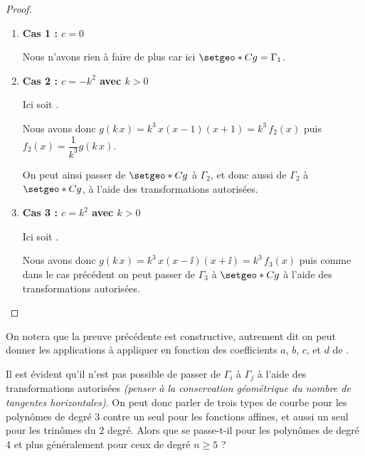 \begin{proof}
\begin{enumerate}


		\item \textbf{Cas 1 : $c = 0$}

		      \smallskip

		      \noindent
		      Nous n'avons rien à faire de plus car ici $\setgeo*{C}{g} = \Gamma_1$.




		\item \textbf{Cas 2 : $c = - k^2$ avec $k > 0$}

		      \smallskip

		      \noindent
		      Ici
		      soit
		      .

		      \smallskip

		      \noindent
		      Nous avons donc $g(k \, x) = k^3 \, x(x - 1)(x + 1) = k^3 \, f_2(x)$
		      puis
		      $f_2(x) = \dfrac{1}{k^3} g(k \, x)$.

		      \smallskip

		      \noindent
		      On peut ainsi passer de $\setgeo*{C}{g}$ à $\Gamma_2$, et donc aussi de $\Gamma_2$ à $\setgeo*{C}{g}$, à l'aide des transformations autorisées.




		\item \textbf{Cas 3 : $c = k^2$ avec $k > 0$}

		      \smallskip

		      \noindent
		      Ici
		      soit
		      .

		      \smallskip

		      \noindent
		      Nous avons donc $g(k \, x) = k^3 \, x(x - \ii)(x + \ii) = k^3 \, f_3(x)$
		      puis comme dans le cas précédent on peut passer de $\Gamma_3$ à $\setgeo*{C}{g}$ à l'aide des transformations autorisées.
	\end{enumerate}
\end{proof}




On notera que la preuve précédente est constructive, autrement dit on peut donner les applications à appliquer en fonction des coefficients $a$, $b$, $c$, et $d$ de .




\medskip

Il est évident qu'il n'est pas possible de passer de $\Gamma_i$  à $\Gamma_j$ à l'aide des transformations autorisées \emph{(penser à la conservation géométrique du nombre de tangentes horizontales)}.
On peut donc parler de trois types de courbe pour les polynômes de degré 3 contre un seul pour les fonctions affines, et aussi un seul pour les trinômes du 2\ieme{} degré.
Alors que se passe-t-il pour les polynômes de degré 4 et plus généralement pour ceux de degré $n \geq 5$ ?